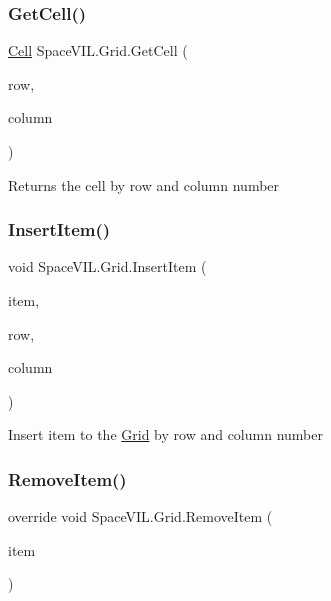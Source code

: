 \subsubsection{\texorpdfstring{Get\+Cell()}{GetCell()}}
{\footnotesize\ttfamily \mbox{\hyperlink{class_space_v_i_l_1_1_cell}{Cell}} Space\+V\+I\+L.\+Grid.\+Get\+Cell (\begin{DoxyParamCaption}\item[{int}]{row,  }\item[{int}]{column }\end{DoxyParamCaption})}



Returns the cell by row and column number 

\mbox{\label{class_space_v_i_l_1_1_grid_a2292fca3813854b6077716e00ad54df4}} 
\subsubsection{\texorpdfstring{Insert\+Item()}{InsertItem()}}
{\footnotesize\ttfamily void Space\+V\+I\+L.\+Grid.\+Insert\+Item (\begin{DoxyParamCaption}\item[{\mbox{\hyperlink{interface_space_v_i_l_1_1_core_1_1_i_base_item}{I\+Base\+Item}}}]{item,  }\item[{int}]{row,  }\item[{int}]{column }\end{DoxyParamCaption})}



Insert item to the \mbox{\hyperlink{class_space_v_i_l_1_1_grid}{Grid}} by row and column number 

\mbox{\label{class_space_v_i_l_1_1_grid_a75bf61cabb387baea7461141dce079fb}} 
\subsubsection{\texorpdfstring{Remove\+Item()}{RemoveItem()}}
{\footnotesize\ttfamily override void Space\+V\+I\+L.\+Grid.\+Remove\+Item (\begin{DoxyParamCaption}\item[{\mbox{\hyperlink{interface_space_v_i_l_1_1_core_1_1_i_base_item}{I\+Base\+Item}}}]{item }\end{DoxyParamCaption})\hspace{0.3cm}{\ttfamily [virtual]}}



